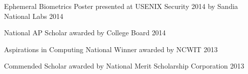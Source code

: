 

\begin{cvhonors}

  \cvhonor
    {Ephemeral Biometrics Poster} %
    {presented at USENIX Security 2014 by Sandia National Labs} %
    {2014}
    {}

      \cvhonor
    {National AP Scholar} %
    {awarded by College Board} %
    {2014}
    {}

  \cvhonor
    {Aspirations in Computing National Winner} %
    {awarded by NCWIT} %
    {2013}
    {}

  \cvhonor
    {Commended Scholar} %
    {awarded by National Merit Scholarship Corporation} %
    {2013}
    {}


\end{cvhonors}